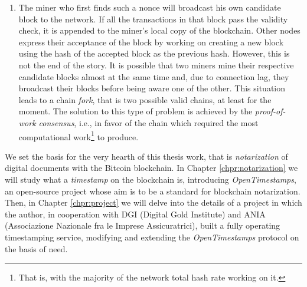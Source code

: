 \begin{enumerate}
    \begin{mydef}{\bf (Bitcoin proof-of-work)}.
        \label{def:btc-pow}
        The Bitcoin proof-of-work consists of finding a special number $x$ called nonce s.t. the double SHA256 of the candidate block header falls below a given threshold\textup{\footnote{More precisely, the difficulty $d$ is calculated as: $d=\frac{\text{difficulty\_1\_target}}{\text{current\_target}}$. Traditionally, the \textit{difficulty\_1\_target} represents a hash where the leading 32 bits are zero and the rest are one, known as \textit{pool difficulty}, or \textit{pdiff}. Thus, the threshold value appears as $\frac{2^{224}}{d}$ and not $\frac{2^{256}}{d}$. In addition, the mining threshold is adaptively adjusted every 2016 blocks to achieve an average goal of a block 10 minutes (i.e. every 2 weeks).}}:
        $$F_{d}(c,x) \rightarrow \text{SHA256}(\text{SHA256}(\underbrace{... \| \text{prev\_block\_header\_hash} \| ... \| x}_{\text{Candidate Block Header}})) < \frac{2^{224}}{d}$$
    \end{mydef}
    
    \item The miner who first finds such a nonce will broadcast his own candidate block to the network. If all the transactions in that block pass the validity check, it is appended to the miner's local copy of the blockchain. Other nodes express their acceptance of the block by working on creating a new block using the hash of the accepted block as the previous hash. However, this is not the end of the story. It is possible that two miners mine their respective candidate blocks almost at the same time and, due to connection lag, they broadcast their blocks before being aware one of the other. This situation leads to a chain \textit{fork}, that is two possible valid chains, at least for the moment. The solution to this type of problem is achieved by the \textit{proof-of-work consensus}, i.e., in favor of the chain which required the most computational work\footnote{That is, with the majority of the network total hash rate working on it.} to produce.

\end{enumerate}

\bigskip
\noindent
We set the basis for the very hearth of this thesis work, that is \textit{notarization} of digital documents with the Bitcoin blockchain. In Chapter \ref{chpr:notarization} we will study what a \textit{timestamp} on the blockchain is, introducing \textit{OpenTimestamps}, an open-source project whose aim is to be a standard for blockchain notarization. Then, in Chapter \ref{chpr:project} we will delve into the details of a project in which the author, in cooperation with DGI (Digital Gold Institute) and ANIA (Associazione Nazionale fra le Imprese Assicuratrici), built a fully operating timestamping service, modifying and extending the \textit{OpenTimestamps} protocol on the basis of need.